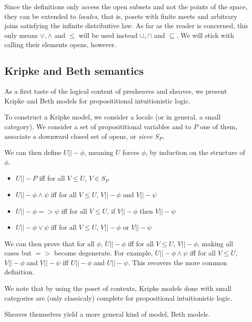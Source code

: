 \documentclass[11pt]{article}
\newcommand{\0}{\mathbf{0}}
\newcommand{\1}{\mathbf{1}}
\begin{document}
Since the definitions only access the open subsets and not the points of the space, they can be extended to \emph{locales}, that is, posets with finite meets and arbitrary joins satisfying the infinite distributive law. As far as the reader is concerned, this only means $\vee,\wedge$ and $\leq$ will be used instead $\cup,\cap$ and $\subseteq$. We will stick with calling their elements opens, however.

\subsection{Kripke and Beth semantics}\label{KripkeBeth}
As a first taste of the logical content of presheaves and sheaves, we present Kripke and Beth models for proposititional intuitionistic logic.


To construct a Kripke model, we consider a locale (or in general, a small category). We consider a set of proposititional variables and to $P$ one of them, associate a downward closed set of opens, or \emph{sieve} $S_P$.

We can then define $U ||- \phi$, meaning $U$ forces $\phi$, by induction on the structure of $\phi$.
\begin{itemize}
    \item $U ||- P$ iff for all $V\leq U$, $V \in S_P$
    \item $U ||- \phi \wedge \psi$ iff for all $V\leq U$, $V ||- \phi$ and $V ||- \psi$
    \item $U ||- \phi => \psi$ iff for all $V \leq U$, if $V ||- \phi$ then $V ||- \psi $
    \item $U ||- \phi \vee \psi $ iff for all $V \leq U$, $V ||- \phi$ or $V ||- \psi$
\end{itemize}
We can then prove that for all $\phi$, $U||-\phi$ iff for all $V \leq U$, $V ||- \phi$, making all cases but $ => $ become degenerate. For example, $U ||- \phi \wedge \psi$ iff for all $V \leq U$, $ V||- \phi$ and $V ||- \psi$ iff $U||- \phi$ and $U||- \psi$. This recovers the more common definition.

We note that by using the poset of contexts, Kripke models done with small categories are (only classicaly) complete for propositional intuitionistic logic.

Sheaves themselves yield a more general kind of model, Beth models.
\end{document}
